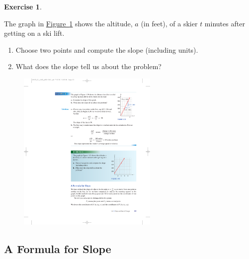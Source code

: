 \documentclass[10pt,]{book}
\theoremstyle{plain}
\theoremstyle{definition}
\theoremstyle{definition}
\theoremstyle{definition}
\theoremstyle{definition}
\newtheorem{exercise}[theorem]{Exercise}
\numberwithin{equation}{section}
\begin{document}
\begin{exercise}\label{example-ski-lift}

    The graph in \hyperref[fig-ski-lift]{Figure~\ref{fig-ski-lift}} shows the altitude, \(a\) (in feet), of a skier \(t\) minutes after getting on a ski lift.
    \leavevmode%
\begin{enumerate}[label=*\alph**]
\item\hypertarget{li-151}{}Choose two points and compute the slope (including units).\item\hypertarget{li-152}{}What does the slope tell us about the problem?\end{enumerate}
\leavevmode%
\begin{figure}
\centering
\includegraphics[width=0.60\textwidth,]{images/fig-ski-lift.pdf}\caption{\label{fig-ski-lift}}
\end{figure}
\end{exercise}
\typeout{************************************************}
\typeout{************************************************}
\subsection[A Formula for Slope]{A Formula for Slope}\label{subsection-23}
\end{document}
